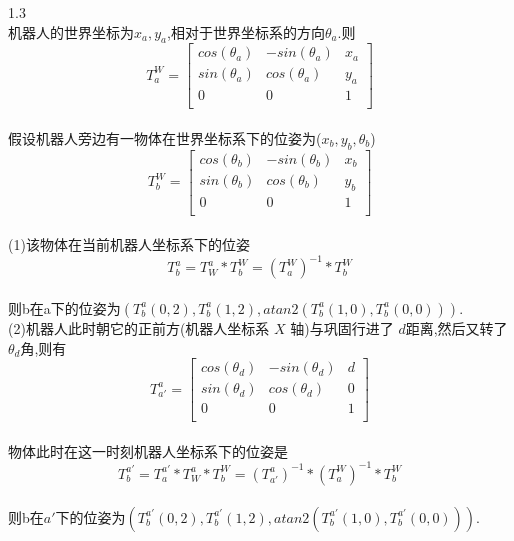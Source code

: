 \documentclass{article}
\begin{document}
1.3
\\机器人的世界坐标为$x_a,y_a$,相对于世界坐标系的方向$\theta_a$.则
\\$$T_{a}^W=
\left[                
	\begin{array}{ccc}   
		cos(\theta_a)  & -sin(\theta_a) & x_a \\  
		sin(\theta_a) & cos(\theta_a)  & y_a \\  
		0            & 0            & 1 \\  
	\end{array}
\right]
$$
\\假设机器人旁边有一物体在世界坐标系下的位姿为($x_b,y_b,\theta_b$)
\\$$T_{b}^W=
\left[                
	\begin{array}{ccc}   
		cos(\theta_b)  & -sin(\theta_b) & x_b \\  
		sin(\theta_b) & cos(\theta_b)  & y_b \\  
		0            & 0            & 1 \\  
	\end{array}
\right]
$$
\\(1)该物体在当前机器人坐标系下的位姿
\\$$T_{b}^a=T_{W}^a*T_{b}^W=(T_{a}^W)^{-1}*T_{b}^W$$
\\ 则b在a下的位姿为$(T_{b}^a(0,2),T_{b}^a(1,2),atan2(T_{b}^a(1,0),T_{b}^a(0,0)))$.
\\(2)机器人此时朝它的正前方(机器人坐标系 $X$ 轴)与巩固行进了 $d$距离,然后又转了 $\theta_d$角,则有
\\$$T_{a'}^a=
\left[                
	\begin{array}{ccc}   
		cos(\theta_d)  & -sin(\theta_d) & d \\  
		sin(\theta_d) & cos(\theta_d)  & 0 \\  
		0            & 0            & 1 \\  
	\end{array}
\right]
$$
\\物体此时在这一时刻机器人坐标系下的位姿是
\\$$T_{b}^{a'}=T_{a}^{a'}*T_{W}^{a}*T_{b}^W=(T_{a'}^{a})^{-1}*(T_{a}^W)^{-1}*T_{b}^W$$
\\ 则b在$a'$下的位姿为$(T_{b}^{a'}(0,2),T_{b}^{a'}(1,2),atan2(T_{b}^{a'}(1,0),T_{b}^{a'}(0,0)))$.
\end{document}
